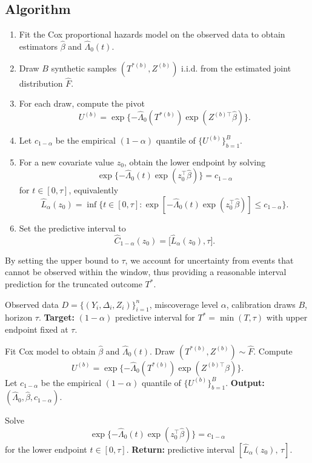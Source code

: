 \documentclass[12pt]{article}
\makeatletter
\let\thesis@section\subsection
\let\thesis@subsection\subsubsection
\renewcommand{\section}{\thesis@section}
\renewcommand{\subsection}{\thesis@subsection}
\makeatother
\begin{document}
\section{\texorpdfstring{\textcolor{revisionblue}{Algorithm}}{Algorithm}}
{\color{revisionblue}
\begin{enumerate}
\item Fit the Cox proportional hazards model on the observed data
to obtain estimators $\widehat\beta$ and $\widehat\Lambda_0(t)$.
\item Draw $B$ synthetic samples $(T^{*(b)}, Z^{(b)})$ i.i.d. from the estimated
joint distribution $\widehat F$.
\item For each draw, compute the pivot
\[
U^{(b)} = \exp\{-\widehat\Lambda_0(T^{*(b)})\exp(Z^{(b)\top}\widehat\beta)\}.
\]
\item Let $c_{1-\alpha}$ be the empirical $(1-\alpha)$ quantile of
$\{U^{(b)}\}_{b=1}^B$.
\item For a new covariate value $z_0$, obtain the lower endpoint by solving
\[
\exp\{-\widehat\Lambda_0(t)\exp(z_0^\top\widehat\beta)\}=c_{1-\alpha}
\]
for $t\in[0,\tau]$, equivalently
\[
\widehat L_\alpha(z_0)
= \inf\{t\in[0,\tau]:\exp[-\widehat\Lambda_0(t)\exp(z_0^\top\widehat\beta)] \le c_{1-\alpha}\}.
\]
\item Set the predictive interval to
\[
\widehat C_{1-\alpha}(z_0)=\big[\widehat L_\alpha(z_0),\tau\big].
\]
\end{enumerate}
By setting the upper bound to $\tau$, we account for uncertainty from events that cannot be observed within the window, thus providing a reasonable interval prediction for the truncated outcome $T^*$. 
}

\begin{algorithm}[H]
\caption{\textcolor{revisionblue}{Conformal Predictive Interval for $T^*$ under Finite Observation Window}}
\label{alg:rcensored}
{\color{revisionblue}
\begin{algorithmic}[1]

\Require Observed data $D=\{(Y_i,\Delta_i,Z_i)\}_{i=1}^n$, miscoverage level $\alpha$, calibration draws $B$, horizon $\tau$.
\Statex \textbf{Target:} $(1-\alpha)$ predictive interval for $T^*=\min(T,\tau)$ with upper endpoint fixed at $\tau$.

    \State Fit Cox model to obtain $\widehat\beta$ and $\widehat\Lambda_0(t)$.
        \State Draw $(T^{*(b)},Z^{(b)}) \sim \widehat F$.
        \State Compute
        \[
        U^{(b)}=\exp\{-\widehat\Lambda_0(T^{*(b)})\exp(Z^{(b)\top}\widehat\beta)\}.
        \]
    \EndFor
    \State Let $c_{1-\alpha}$ be the empirical $(1-\alpha)$ quantile of $\{U^{(b)}\}_{b=1}^B$.
    \State \textbf{Output:} $(\widehat\Lambda_0,\widehat\beta,c_{1-\alpha})$.
\EndProcedure

\Statex
{}
    \State Solve
    \[
    \exp\{-\widehat\Lambda_0(t)\exp(z_0^\top\widehat\beta)\}=c_{1-\alpha}
    \]
    for the lower endpoint $t\in[0,\tau]$.
    \State \textbf{Return:} predictive interval $[\widehat L_\alpha(z_0),\,\tau]$.
\EndFunction

\end{algorithmic}
}
\end{algorithm}
\end{document}
